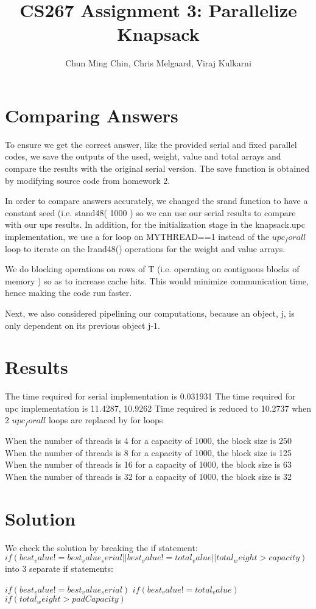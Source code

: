 \documentclass[11pt]{amsart}
\title{CS267 Assignment 3: Parallelize Knapsack}
\author{Chun Ming Chin, Chris Melgaard, Viraj Kulkarni }
\begin{document}
\maketitle




\section{Comparing Answers}

To ensure we get the correct answer, like the provided serial and fixed parallel codes, we save the outputs of the used, weight, value and total arrays and compare the results with the original serial version. The save function is obtained by modifying source code from homework 2.

In order to compare answers accurately, we changed the srand function to have a constant seed (i.e. stand48( 1000 ) so we can use our serial results to compare with our ups results. In addition, for the initialization stage in the knapsack.upc implementation, we use a for loop on MYTHREAD==1 instead of the $upc_forall$ loop to iterate on the lrand48() operations for the weight and value arrays. 

We do blocking operations on rows of T (i.e. operating on contiguous blocks of memory )  so as to increase cache hits. This would minimize communication time, hence making the code run faster. 

Next, we also considered pipelining our computations, because an object, j, is only dependent on its previous object j-1.

\section{Results}

The time required for serial implementation is 0.031931
The time required for upc implementation is 11.4287, 10.9262
Time required is reduced to 10.2737 when 2 $upc_forall$ loops are replaced by for loops 

When the number of threads is 4 for a capacity of 1000, the block size is 250
When the number of threads is 8 for a capacity of 1000, the block size is 125
When the number of threads is 16 for a capacity of 1000, the block size is 63
When the number of threads is 32 for a capacity of 1000, the block size is 32

\section{Solution}
We check the solution by breaking the if statement: 
$if( best_value != best_value_serial || best_value != total_value || total_weight > capacity )$
into 3 separate if statements:

$ if( best_value != best_value_serial ) $
$ if( best_value != total_value )$
$ if( total_weight > padCapacity ) $ 
\end{document}
